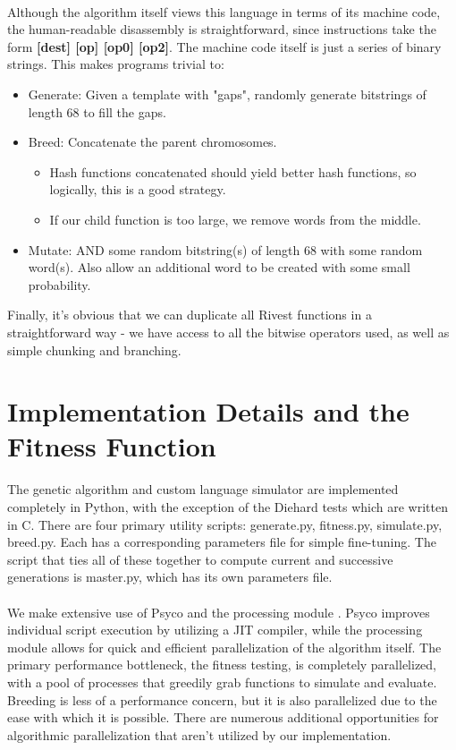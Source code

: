 \documentclass{article}
\begin{document}
\paragraph{}
Although the algorithm itself views this language in terms of its machine code, the human-readable disassembly is straightforward, since instructions take the form \textbf{[dest] [op] [op0] [op2]}. The machine code itself is just a series of binary strings. This makes programs trivial to:
	\begin{itemize}
	\item Generate: Given a template with "gaps", randomly generate bitstrings of length 68 to fill the gaps.
	\item Breed: Concatenate the parent chromosomes.
		\begin{itemize}
			\item Hash functions concatenated should yield better hash functions, so logically, this is a good strategy.
			\item If our child function is too large, we remove words from the middle.
		\end{itemize}
	\item Mutate: AND some random bitstring(s) of length 68 with some random word(s). Also allow an additional word to be created with some small probability.
	\end{itemize}

Finally, it's obvious that we can duplicate all Rivest functions in a straightforward way - we have access to all the bitwise operators used, as well as simple chunking and branching.

\section{Implementation Details and the Fitness Function}
The genetic algorithm and custom language simulator are implemented completely in Python, with the exception of the Diehard tests \cite{Diehard} which are written in C. There are four primary utility scripts: generate.py, fitness.py, simulate.py, breed.py. Each has a corresponding parameters file for simple fine-tuning. The script that ties all of these together to compute current and successive generations is master.py, which has its own parameters file.

\paragraph{}
We make extensive use of Psyco \cite{Psyco} and the processing module \cite{Processing}. Psyco improves individual script execution by utilizing a JIT compiler, while the processing module allows for quick and efficient parallelization of the algorithm itself.
The primary performance bottleneck, the fitness testing, is completely parallelized, with a pool of processes that greedily grab functions to simulate and evaluate. Breeding is less of a performance concern, but it is also parallelized due to the ease with which it is possible. There are numerous additional opportunities for algorithmic parallelization that aren't utilized by our implementation.
\end{document}
